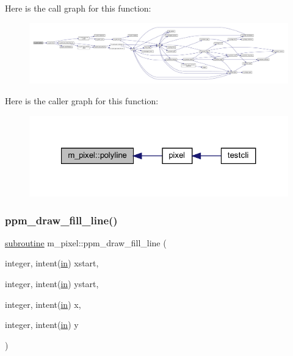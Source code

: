 Here is the call graph for this function\+:
\nopagebreak
\begin{figure}[H]
\begin{center}
\leavevmode
\includegraphics[width=350pt]{namespacem__pixel_a067e896f50047694a52c30cffa6f502f_cgraph}
\end{center}
\end{figure}
Here is the caller graph for this function\+:
\nopagebreak
\begin{figure}[H]
\begin{center}
\leavevmode
\includegraphics[width=321pt]{namespacem__pixel_a067e896f50047694a52c30cffa6f502f_icgraph}
\end{center}
\end{figure}
\mbox{\label{namespacem__pixel_a6f75bc951acd07267e0841ca5985d8b7}} 
\subsubsection{\texorpdfstring{ppm\+\_\+draw\+\_\+fill\+\_\+line()}{ppm\_draw\_fill\_line()}}
{\footnotesize\ttfamily \hyperlink{M__stopwatch_83_8txt_acfbcff50169d691ff02d4a123ed70482}{subroutine} m\+\_\+pixel\+::ppm\+\_\+draw\+\_\+fill\+\_\+line (\begin{DoxyParamCaption}\item[{integer, intent(\hyperlink{M__journal_83_8txt_afce72651d1eed785a2132bee863b2f38}{in})}]{xstart,  }\item[{integer, intent(\hyperlink{M__journal_83_8txt_afce72651d1eed785a2132bee863b2f38}{in})}]{ystart,  }\item[{integer, intent(\hyperlink{M__journal_83_8txt_afce72651d1eed785a2132bee863b2f38}{in})}]{x,  }\item[{integer, intent(\hyperlink{M__journal_83_8txt_afce72651d1eed785a2132bee863b2f38}{in})}]{y }\end{DoxyParamCaption})\hspace{0.3cm}{\ttfamily [private]}}



